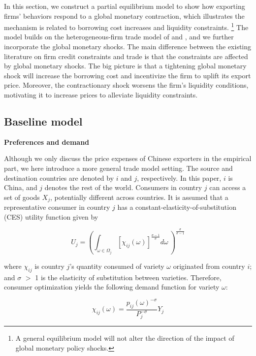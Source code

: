 In this section, we construct a partial equilibrium model to show how exporting firms' behaviors respond to a global monetary contraction, which illustrates the mechanism is related to borrowing cost increases and liquidity constraints.  \footnote{A general equilibrium model will not alter the direction of the impact of global monetary policy shocks.} The model builds on the heterogeneous-firm trade model of \cite{melitz2003impact} and \cite{manova2013credit}, and we further incorporate the global monetary shocks. The main difference between the existing literature on firm credit constraints and trade is that the constraints are affected by global monetary shocks. The big picture is that a tightening global monetary shock will increase the borrowing cost and incentivize the firm to uplift its export price. Moreover, the contractionary shock worsens the firm's liquidity conditions, motivating it to increase prices to alleviate liquidity constraints.

\subsection{Baseline model}

\textbf{Preferences and demand}

Although we only discuss the price expenses of Chinese exporters in the empirical part, we here introduce a more general trade model setting. The source and destination countries are denoted by $i$ and $j$, respectively. In this paper, $i$ is China, and $j$ denotes the rest of the world. Consumers in country $j$ can access a set of goods $X_j$, potentially different across countries. It is assumed that a representative consumer in country $j$ has a constant-elasticity-of-substitution (CES) utility function given by

\begin{equation}
U_j=(\int_{\omega \in \Omega_j} [\chi_{ij}(\omega)]^{\frac{\sigma-1}{\sigma}} d\omega\ )^\frac{\sigma}{\sigma-1}
\end{equation}

where $\chi_{ij}$ is country $j$’s quantity consumed of variety $\omega$ originated from country $i$; and $\sigma$ $>$ 1 is the elasticity of substitution between varieties. Therefore, consumer optimization yields the following demand function for variety $\omega$:

\begin{equation}
\chi_{ij}(\omega)=\frac{p_{ij}(\omega)^{-\sigma}}{P_j^{-\sigma}} Y_j
\end{equation}


